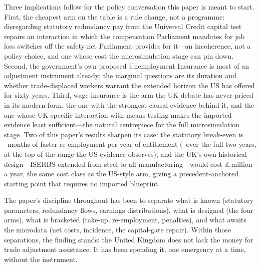 Three implications follow for the policy conversation this paper is
meant to start. First, the cheapest arm on the table is a rule change,
not a programme: disregarding statutory redundancy pay from the
Universal Credit capital test repairs an interaction in which the
compensation Parliament mandates for job loss switches off the safety
net Parliament provides for it---an incoherence, not a policy choice,
and one whose cost the microsimulation stage can pin down. Second, the
government's own proposed Unemployment Insurance is most of an
adjustment instrument already; the marginal questions are its duration
and whether trade-displaced workers warrant the extended horizon the US
has offered for sixty years. Third, wage insurance is the arm the UK
debate has never priced in its modern form, the one with the strongest
causal evidence behind it, and the one whose UK-specific interaction with
means-testing makes the imported evidence least sufficient---the natural
centrepiece for the full microsimulation stage. Two of this paper's
results sharpen its case: the statutory break-even is
\TaaBreakEvenMonths\ months of faster re-employment per year of
entitlement (\TaaBreakEvenMonthsFull\ over the full two years, at the
top of the range the US evidence observes); and the UK's own historical
design---ISERBS extended from steel to all manufacturing---would cost
\pounds\TaaIserbsCost\,million a year, the same cost class as the
US-style arm, giving a precedent-anchored starting point that requires
no imported blueprint.

The paper's discipline throughout has been to separate what is known
(statutory parameters, redundancy flows, earnings distributions), what
is designed (the four arms), what is bracketed (take-up, re-employment,
penalties), and what awaits the microdata (net costs, incidence, the
capital-gate repair). Within those separations, the finding stands: the
United Kingdom does not lack the money for trade adjustment assistance.
It has been spending it, one emergency at a time, without the
instrument.
